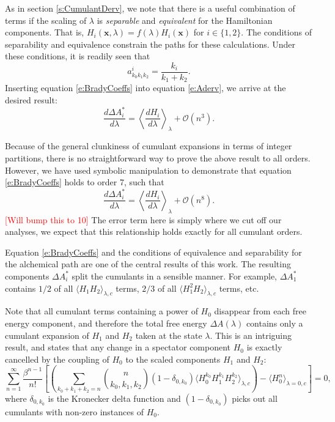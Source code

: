 \documentclass[%
 preprint,
 amsmath,amssymb,
 aps,
]{revtex4-1}
\newcommand{\warning}[1]{{\textsf{{\textcolor{red}{{[#1]}{}}}}}}
\renewcommand{\vec}[1]{{\mathbf{#1}}}
\begin{document}
As in section \ref{s:CumulantDerv}, we note that there is a useful combination of terms if the scaling of $\lambda$ is \emph{separable} and \emph{equivalent} for the Hamiltonian components.  That is, $H_i \left( \vec{x}, \lambda \right) = f(\lambda) H_i \left( \vec{x}\right) $
for $i \in \{1,2\}$.  The conditions of separability and equivalence constrain the paths for these calculations.  Under these conditions, it is readily seen that 
\begin{equation}
a^i_{k_0k_1k_2} = \frac{k_i}{k_1+k_2}. 
\label{e:BradyCoeffs}
\end{equation}
Inserting equation \ref{e:BradyCoeffs} into equation \ref{e:Aderv}, we arrive at the desired result:
\begin{equation}
\frac{d \Delta A^*_i}{d \lambda} =   \left\langle \frac{dH_i}{d \lambda} \right \rangle_{\lambda} + \mathcal{O} (n^3). 
\label{e:BradyProof}
\end{equation}

Because of the general clunkiness of cumulant expansions in terms of integer partitions, there is no straightforward way to prove the above result to all orders.  However, we have used symbolic manipulation to demonstrate that equation \ref{e:BradyCoeffs} holds to order 7, such that
\begin{equation}
\frac{d \Delta A^*_i}{d \lambda} =   \left\langle \frac{dH_i}{d \lambda} \right \rangle_{\lambda} + \mathcal{O} (n^8). 
\label{e:BradyProof2}
\end{equation}
\warning{Will bump this to 10}
The error term here is simply where we cut off our analyses, we expect that this relationship holds exactly for all cumulant orders.  

Equation \ref{e:BradyCoeffs} and the conditions of equivalence and separability for the alchemical path are one of the central results of this work. The resulting components $\Delta A^*_i$ split the cumulants in a sensible manner.  For example, $\Delta A^*_1$ contains $1/2$ of all $\langle  H_1 H_2\rangle_{\lambda,c}$ terms, $2/3$ of all $\langle  H_1^2 H_2\rangle_{\lambda,c}$ terms, etc. 

Note that all cumulant terms containing a power of $H_0$ disappear from each free energy component, and therefore 
the total free energy $\Delta A (\lambda) $ contains only a cumulant expansion of $H_1$ and $H_2$ taken at the state $\lambda$. 
This is an intriguing result, and states that any change in a spectator component $H_0$ is exactly cancelled by the coupling of $H_0$ to the scaled components $H_1$ and $H_2$:
 \begin{equation}
\sum_{n=1}^{\infty}  \frac{\beta^{n-1}}{n!} 
\left[
\left(
 \sum_{k_0+k_1+k_2=n} 
{ n \choose k_0,k_1,k_2 } \left( 1- \delta_{0,k_0}  \right) \langle  H_0^{k_0} H_1^{k_1} H_2^{k_2} \rangle_{\lambda,c}
\right)
-  \langle  H_0^{n}  \rangle_{\lambda=0,c} \right] = 0,
\label{e:SpectatorCancellation}
\end{equation}
where $\delta_{0,k_0} $ is the Kronecker delta function and $ \left( 1- \delta_{0,k_0}  \right)$ picks out all cumulants with non-zero instances of $H_0$. 
\end{document}
